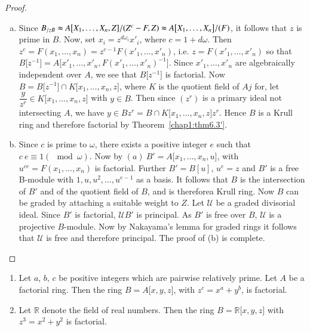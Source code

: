 \begin{proof}
\begin{enumerate}[(a)]
\item Since $B_{/z B} \thickapprox A \big [X_1, \ldots , X_n, Z] /
  (Z^c - F, Z) \thickapprox   A \big [X_1, \ldots , X_n \big] /\break
  (F)$, it follows that $z$ is prime in $B$. Now, set $x_i = z^{d
  \omega_i} x'_i$, where $c = 1 + d \omega$. Then $z^c = F(x_1, \ldots
  , x_n) = z^{c - 1} F(x'_1, \ldots , x'_n)$, i.e. $z = F(x'_1, \ldots
  , x'_n)$ so that $B \big[ z^{-1 } \big] = A \big [ x'_1, \ldots ,
  x'_n, F(x'_1, \ldots , x'_n)^{-1} \big]$. Since $x'_1, \ldots ,
  x'_n$ are algebraically independent over $A$, we see that $B \big
  [z^{-1} \big] $ is factorial. Now $B = B \big [ z^{-1}\big] \cap K
  \big[ x_1, \ldots , x_n, z \big]$, where $K$ is the quotient
  field of $A j$ for, let $\dfrac{y}{z^r} \in  K \big[x_1, \ldots , x_n,
    z \big]$ with $y \in B$. Then since $(z^r)$ is a primary ideal not
  intersecting $A$, we have $y \in B z^r = B \cap K \big[ x_1,
    \ldots , x_n, z \big] z^r$. Hence $B$ is a Krull ring and
  therefore factorial by Theorem~\ref{chap1:thm6.3'}. 

\item Since $c$ is prime to $\omega$, there exists a positive integer
  $e$ such that $c ~ e \equiv 1 (\mod \omega)$. Now by $(a) ~ B' = A
  \big[ x_1, \ldots , x_n, u \big]$, with $u^{ce} = F (x_1, \ldots
  , x_n)$ is factorial. Further $B' = B [u]$, $u^e = z$ and $B' $ is a
  free B-module with $1, u, u^2, \ldots , u^{e-1}$ as a basis. It
  follows that $B$ is the intersection of $B'$ and of the quotient
  field of $B$, and is therefore\pageoriginale a Krull ring. Now $B$
  can be graded 
  by attaching a suitable weight to $Z$. Let $\mathscr{U} $ be a
  graded divisorial ideal. Since $B'$ is factorial, $\mathscr{U} B'$ is
  principal. As $B'$ is free over $B$, $\mathscr{U}$ is a projective
  $B$-module. Now by Nakayama's lemma for graded rings it follows that
  $\mathscr{U}$ is free and therefore principal. The proof  of (b)
  is complete. 
\end{enumerate}
\end{proof} 
 
      
\begin{examples*}
\begin{enumerate}[(1)]
\item Let $a$, $b$, $c$ be positive integers which are pairwise relatively
  prime. Let $A$ be a factorial ring. Then the ring $B = A \big [x, y,
    z \big]$, with $z^c = x^a + y^b$, is factorial. 

\item Let $\mathbb{R}$ denote the field of real numbers. Then the ring
  $B = \mathbb{R} \big[ x, y, z \big]$ with $z^3 = x^2 + y^2$ is
  factorial. 
\end{enumerate}
\end{examples*}

